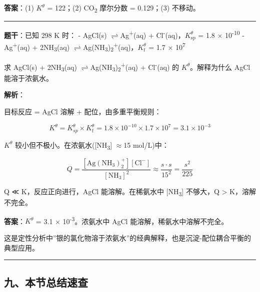 \documentclass[a4paper,11pt]{ctexart}
\newcommand{\箭}{\ensuremath{\rightarrow}}
\newcommand{\左箭}{\ensuremath{\leftarrow}}
\newcommand{\上箭}{\ensuremath{\uparrow}}
\newcommand{\下箭}{\ensuremath{\downarrow}}
\newcommand{\衡}{\ensuremath{\rightleftharpoons}}
\newcommand{\双箭}{\ensuremath{\leftrightarrow}}
\newcommand{\约等于}{\ensuremath{\approx}}
\newcommand{\小于等于}{\ensuremath{\leq}}
\newcommand{\大于等于}{\ensuremath{\geq}}
\newcommand{\不等于}{\ensuremath{\neq}}
\newcommand{\西格马}{\ensuremath{\sigma}}
\newcommand{\派}{\ensuremath{\pi}}
\begin{document}
\textbf{答案}：(1) \(K^\theta\) = 122；(2) CO\textsubscript{2} 摩尔分数 = 0.129；(3) 不移动。

\begin{center}\rule{0.5\linewidth}{0.5pt}\end{center}

\textbf{题干}：已知 298 K 时：
- AgCl(s) \衡 Ag\textsuperscript{+}(aq) + Cl\textsuperscript{-}(aq)，\(K_{\mathrm{sp}}^\theta\) = 1.8 × 10\textsuperscript{-10}
- Ag\textsuperscript{+}(aq) + 2NH\textsubscript{3}(aq) \衡 Ag(NH\textsubscript{3})\textsubscript{2}\textsuperscript{+}(aq)，\(K_{\mathrm f}^\theta\) = 1.7 × 10\textsuperscript{7}

求 AgCl(s) + 2NH\textsubscript{3}(aq) \衡 Ag(NH\textsubscript{3})\textsubscript{2}\textsuperscript{+}(aq) + Cl\textsuperscript{-}(aq) 的 \(K^\theta\)。解释为什么 AgCl 能溶于浓氨水。

\textbf{解析}：

目标反应 = AgCl 溶解 + 配位，由多重平衡规则：

\[K^\theta = K_{sp}^\theta \times K_{\mathrm f}^\theta = 1.8 \times 10^{-10} \times 1.7 \times 10^7 = 3.1 \times 10^{-3}\]

\(K^\theta\) 较小但不极小。在浓氨水({[}NH\textsubscript{3}{]} \约等于 15 mol/L)中：

\[Q = \frac{[\mathrm{Ag(NH_3)_2^+}][\mathrm{Cl^-}]}{[\mathrm{NH_3}]^2} \approx \frac{s \cdot s}{15^2} = \frac{s^2}{225}\]

Q ≪ K，反应正向进行，AgCl 能溶解。在稀氨水中 {[}NH\textsubscript{3}{]} 不够大，Q \textgreater{} K，溶解不完全。

\textbf{答案}：\(K^\theta\) = 3.1 × 10\textsuperscript{-3}。浓氨水中 AgCl 能溶解，稀氨水中溶解不完全。

这是定性分析中''银的氯化物溶于浓氨水''的经典解释，也是沉淀-配位耦合平衡的典型应用。

\begin{center}\rule{0.5\linewidth}{0.5pt}\end{center}

\subsection{九、本节总结速查}\label{ux4e5dux672cux8282ux603bux7ed3ux901fux67e5}
\end{document}
